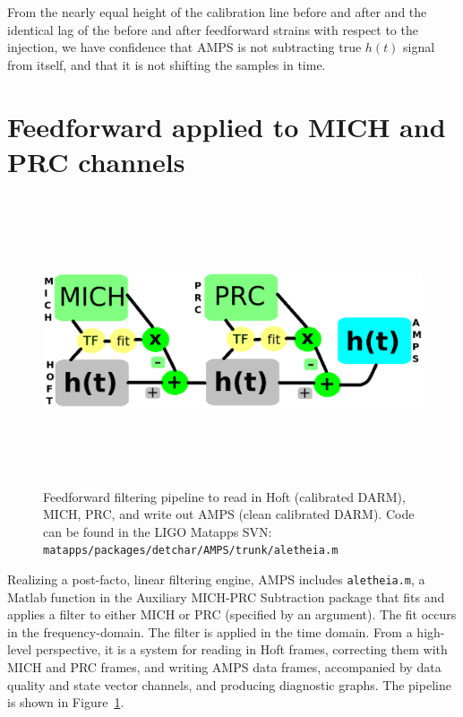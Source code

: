         From the nearly equal height of the calibration line before and after and the identical lag of the before and after feedforward strains with respect to the injection, we have confidence that AMPS is not subtracting true $h(t)$ signal from itself, and that it is not shifting the samples in time.

    \section{Feedforward applied to MICH and PRC channels}
    \label{out-of-loop}

\begin{figure}
\begin{center}
\includegraphics[height=85mm,width=120mm]{figure9.eps}
\caption{Feedforward filtering pipeline to read in Hoft (calibrated DARM), MICH, PRC, and write out AMPS (clean calibrated DARM). Code can be found in the LIGO Matapps SVN: \texttt{matapps/packages/detchar/AMPS/trunk/aletheia.m}}
\label{pipelineGraph}
\end{center}
\end{figure}    

Realizing a post-facto, linear filtering engine, AMPS includes \texttt{aletheia.m}, a Matlab function in the Auxiliary MICH-PRC Subtraction package that fits and applies a filter to either MICH or PRC (specified by an argument). The fit occurs in the frequency-domain. The filter is applied in the time domain. From a high-level perspective, it is a system for reading in Hoft frames, correcting them with MICH and PRC frames, and writing AMPS data frames, accompanied by data quality and state vector channels, and producing diagnostic graphs. The pipeline is shown in Figure~\ref{pipelineGraph}. 

